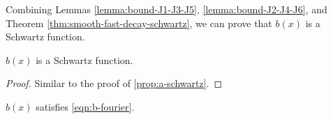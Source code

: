 
Combining Lemmas \ref{lemma:bound-J1-J3-J5}, \ref{lemma:bound-J2-J4-J6}, and Theorem \ref{thm:smooth-fast-decay-schwartz}, we can prove that $b(x)$ is a Schwartz function.

\begin{proposition}\label{prop:b-schwartz}\leanok
$b(x)$ is a Schwartz function.
\end{proposition}
\begin{proof}\leanok
{}
Similar to the proof of \ref{prop:a-schwartz}.
\end{proof}

\begin{proposition}\label{prop:b-fourier}\leanok
$b(x)$ satisfies \eqref{eqn:b-fourier}.
\end{proposition}
